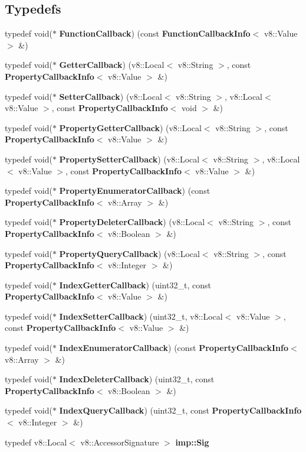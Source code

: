 \subsection*{Typedefs}
\begin{DoxyCompactItemize}
\item 
typedef void($\ast$ \textbf{ Function\+Callback}) (const \textbf{ Function\+Callback\+Info}$<$ v8\+::\+Value $>$ \&)
\item 
typedef void($\ast$ \textbf{ Getter\+Callback}) (v8\+::\+Local$<$ v8\+::\+String $>$, const \textbf{ Property\+Callback\+Info}$<$ v8\+::\+Value $>$ \&)
\item 
typedef void($\ast$ \textbf{ Setter\+Callback}) (v8\+::\+Local$<$ v8\+::\+String $>$, v8\+::\+Local$<$ v8\+::\+Value $>$, const \textbf{ Property\+Callback\+Info}$<$ void $>$ \&)
\item 
typedef void($\ast$ \textbf{ Property\+Getter\+Callback}) (v8\+::\+Local$<$ v8\+::\+String $>$, const \textbf{ Property\+Callback\+Info}$<$ v8\+::\+Value $>$ \&)
\item 
typedef void($\ast$ \textbf{ Property\+Setter\+Callback}) (v8\+::\+Local$<$ v8\+::\+String $>$, v8\+::\+Local$<$ v8\+::\+Value $>$, const \textbf{ Property\+Callback\+Info}$<$ v8\+::\+Value $>$ \&)
\item 
typedef void($\ast$ \textbf{ Property\+Enumerator\+Callback}) (const \textbf{ Property\+Callback\+Info}$<$ v8\+::\+Array $>$ \&)
\item 
typedef void($\ast$ \textbf{ Property\+Deleter\+Callback}) (v8\+::\+Local$<$ v8\+::\+String $>$, const \textbf{ Property\+Callback\+Info}$<$ v8\+::\+Boolean $>$ \&)
\item 
typedef void($\ast$ \textbf{ Property\+Query\+Callback}) (v8\+::\+Local$<$ v8\+::\+String $>$, const \textbf{ Property\+Callback\+Info}$<$ v8\+::\+Integer $>$ \&)
\item 
typedef void($\ast$ \textbf{ Index\+Getter\+Callback}) (uint32\+\_\+t, const \textbf{ Property\+Callback\+Info}$<$ v8\+::\+Value $>$ \&)
\item 
typedef void($\ast$ \textbf{ Index\+Setter\+Callback}) (uint32\+\_\+t, v8\+::\+Local$<$ v8\+::\+Value $>$, const \textbf{ Property\+Callback\+Info}$<$ v8\+::\+Value $>$ \&)
\item 
typedef void($\ast$ \textbf{ Index\+Enumerator\+Callback}) (const \textbf{ Property\+Callback\+Info}$<$ v8\+::\+Array $>$ \&)
\item 
typedef void($\ast$ \textbf{ Index\+Deleter\+Callback}) (uint32\+\_\+t, const \textbf{ Property\+Callback\+Info}$<$ v8\+::\+Boolean $>$ \&)
\item 
typedef void($\ast$ \textbf{ Index\+Query\+Callback}) (uint32\+\_\+t, const \textbf{ Property\+Callback\+Info}$<$ v8\+::\+Integer $>$ \&)
\item 
typedef v8\+::\+Local$<$ v8\+::\+Accessor\+Signature $>$ \textbf{ imp\+::\+Sig}
\end{DoxyCompactItemize}
